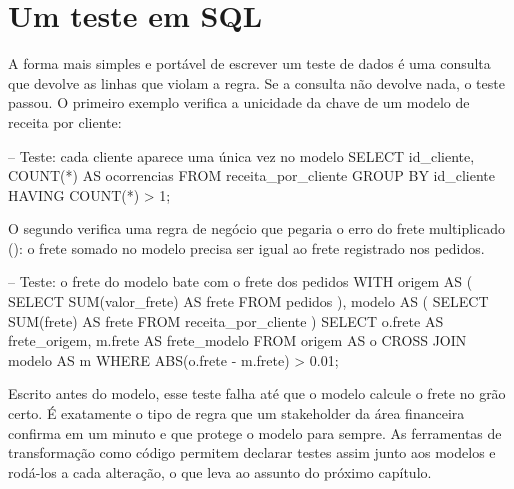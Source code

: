 \section{Um teste em SQL}
\label{sec:teste-sql}

A forma mais simples e portável de escrever um teste de dados é uma consulta que devolve as
linhas que violam a regra. Se a consulta não devolve nada, o teste passou. O primeiro exemplo
verifica a unicidade da chave de um modelo de receita por cliente:

\begin{sql}
-- Teste: cada cliente aparece uma única vez no modelo
SELECT id_cliente, COUNT(*) AS ocorrencias
FROM receita_por_cliente
GROUP BY id_cliente
HAVING COUNT(*) > 1;
\end{sql}

O segundo verifica uma regra de negócio que pegaria o erro do frete multiplicado
(): o frete somado no modelo precisa ser igual ao frete registrado
nos pedidos.

\begin{sql}
-- Teste: o frete do modelo bate com o frete dos pedidos
WITH origem AS (
    SELECT SUM(valor_frete) AS frete FROM pedidos
),
modelo AS (
    SELECT SUM(frete) AS frete FROM receita_por_cliente
)
SELECT o.frete AS frete_origem, m.frete AS frete_modelo
FROM origem AS o
CROSS JOIN modelo AS m
WHERE ABS(o.frete - m.frete) > 0.01;
\end{sql}

Escrito antes do modelo, esse teste falha até que o modelo calcule o frete no grão certo. É
exatamente o tipo de regra que um stakeholder da área financeira confirma em um minuto e que
protege o modelo para sempre. As ferramentas de transformação como código permitem declarar
testes assim junto aos modelos e rodá-los a cada alteração, o que leva ao assunto do próximo
capítulo.

\begin{leituras}
\end{leituras}
